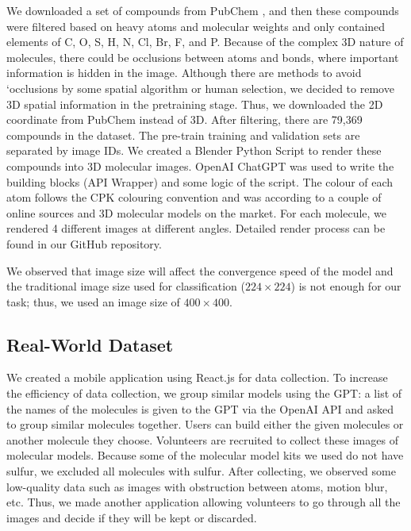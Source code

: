 \documentclass{article}
\begin{document}
We downloaded a set of compounds from PubChem \autocite{kim_pubchem_2023}, and then these compounds were filtered based on heavy atoms and molecular weights and only contained elements of C, O, S, H, N, Cl, Br, F, and P. Because of the complex 3D nature of molecules, there could be occlusions between atoms and bonds, where important information is hidden in the image. Although there are methods to avoid `occlusions by some spatial algorithm or human selection, we decided to remove 3D spatial information in the pretraining stage. Thus, we downloaded the 2D coordinate from PubChem instead of 3D.  
After filtering, there are 79,369 compounds in the dataset. The pre-train training and validation sets are separated by image IDs. We created a Blender Python Script to render these compounds into 3D molecular images. OpenAI ChatGPT was used to write the building blocks (API Wrapper) and some logic of the script. The colour of each atom follows the CPK colouring convention and was according to a couple of online sources and 3D molecular models on the market. For each molecule, we rendered 4 different images at different angles. Detailed render process can be found in our GitHub repository. 

We observed that image size will affect the convergence speed of the model and the traditional image size used for classification ($224\times224$) is not enough for our task; thus, we used an image size of $400\times400$. 
\subsection{Real-World Dataset}
We created a mobile application using React.js for data collection. To increase the efficiency of data collection, we group similar models using the GPT: a list of the names of the molecules is given to the GPT via the OpenAI API and asked to group similar molecules together. Users can build either the given molecules or another molecule they choose. Volunteers are recruited to collect these images of molecular models. Because some of the molecular model kits we used do not have sulfur, we excluded all molecules with sulfur. After collecting, we observed some low-quality data such as images with obstruction between atoms, motion blur, etc. Thus, we made another application allowing volunteers to go through all the images and decide if they will be kept or discarded.
\end{document}
